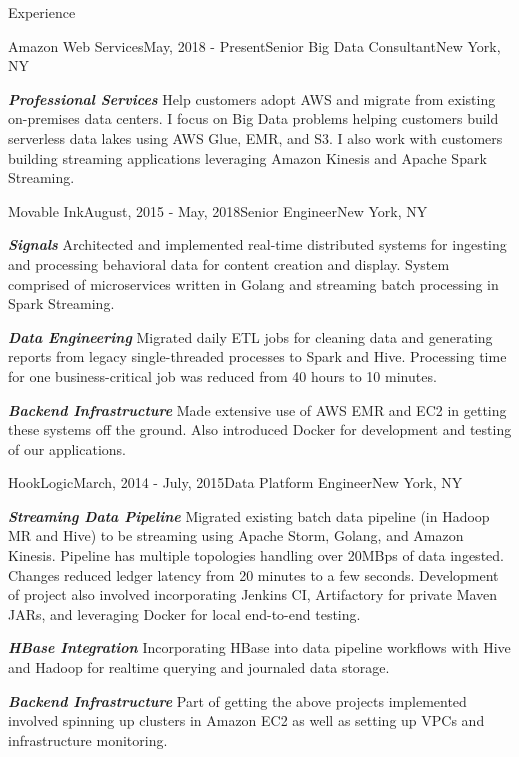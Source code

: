 \documentclass{resume} %
\begin{document}
\begin{rSection}{Experience}

  \begin{rSubsection}{Amazon Web Services}{May, 2018 - Present}{Senior Big Data Consultant}{New York, NY}
  \item \textbf{\textit{Professional Services}} Help customers adopt
    AWS and migrate from existing on-premises data centers.  I focus on Big
    Data problems helping customers build serverless data lakes using AWS Glue,
    EMR, and S3.  I also work with customers building streaming applications
    leveraging Amazon Kinesis and Apache Spark Streaming.

  \end{rSubsection}

  \begin{rSubsection}{Movable Ink}{August, 2015 - May, 2018}{Senior Engineer}{New York, NY}
  \item \textbf{\textit{Signals}} Architected and implemented real-time distributed systems for ingesting and processing behavioral data for content creation and display. System comprised of microservices written in Golang and streaming batch processing in Spark Streaming.
  \item \textbf{\textit{Data Engineering}} Migrated daily ETL jobs for cleaning data and generating reports from legacy single-threaded processes to Spark and Hive. Processing time for one business-critical job was reduced from 40 hours to 10 minutes.
  \item \textbf{\textit{Backend Infrastructure}} Made extensive use of AWS EMR and EC2 in getting these systems off the ground. Also introduced Docker for development and testing of our applications. 


  \end{rSubsection}

  \begin{rSubsection}{HookLogic}{March, 2014 - July, 2015}{Data Platform Engineer}{New York, NY}
  \item \textbf{\textit{Streaming Data Pipeline}} Migrated existing batch data pipeline (in Hadoop MR and Hive) to be streaming using Apache Storm, Golang, and Amazon Kinesis.  Pipeline has multiple topologies handling over 20MBps of data ingested.  Changes reduced ledger latency from 20 minutes to a few seconds.  Development of project also involved incorporating Jenkins CI, Artifactory for private Maven JARs, and leveraging Docker for local end-to-end testing.
  \item \textbf{\textit{HBase Integration}} Incorporating HBase into data pipeline workflows with Hive and Hadoop for realtime querying and journaled data storage.
  \item \textbf{\textit{Backend Infrastructure}} Part of getting the above projects implemented involved spinning up clusters in Amazon EC2 as well as setting up VPCs and infrastructure monitoring.  


\end{rSubsection}
\end{rSection}
\end{document}
